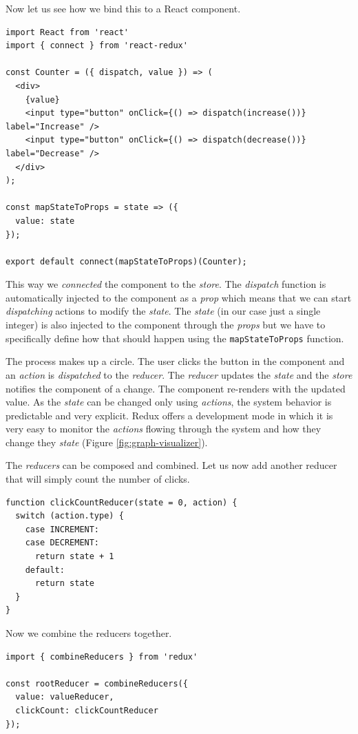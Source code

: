 Now let us see how we bind this to a React component.

\begin{verbatim}
import React from 'react'
import { connect } from 'react-redux'

const Counter = ({ dispatch, value }) => (
  <div>
    {value}
    <input type="button" onClick={() => dispatch(increase())} label="Increase" />
    <input type="button" onClick={() => dispatch(decrease())} label="Decrease" />
  </div>
);

const mapStateToProps = state => ({
  value: state
});

export default connect(mapStateToProps)(Counter);
\end{verbatim}

This way we \emph{connected} the component to the \emph{store}. The \emph{dispatch} function is automatically injected to the component as a \emph{prop} which means that we can start \emph{dispatching} actions to modify the \emph{state}. The \emph{state} (in our case just a single integer) is also injected to the component through the \emph{props} but we have to specifically define how that should happen using the \texttt{mapStateToProps} function.

The process makes up a circle. The user clicks the button in the component and an \emph{action} is \emph{dispatched} to the \emph{reducer}. The \emph{reducer} updates the \emph{state} and the \emph{store} notifies the component of a change. The component re-renders with the updated value. As the \emph{state} can be changed only using \emph{actions}, the system behavior is predictable and very explicit. Redux offers a development mode in which it is very easy to monitor the \emph{actions} flowing through the system and how they change they \emph{state} (Figure \ref{fig:graph-visualizer}).

The \emph{reducers} can be composed and combined. Let us now add another reducer that will simply count the number of clicks.

\begin{verbatim}
function clickCountReducer(state = 0, action) {
  switch (action.type) {
    case INCREMENT:
    case DECREMENT:
      return state + 1
    default:
      return state
  }
}
\end{verbatim}

Now we combine the reducers together.

\begin{verbatim}
import { combineReducers } from 'redux'

const rootReducer = combineReducers({
  value: valueReducer,
  clickCount: clickCountReducer
});
\end{verbatim}


